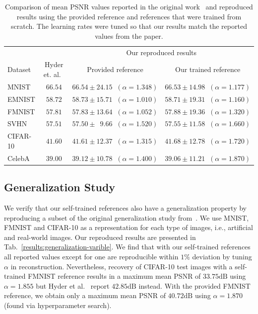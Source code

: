 \begin{table}
	\centering\small
	\begin{tabular}{lccc}
		\toprule
		&  & \multicolumn{2}{c}{Our reproduced results}\\
		Dataset & Hyder et. al.~\cite{hyder2020solving} &\multicolumn{1}{c}{Provided reference} & \multicolumn{1}{c}{Our trained reference}\\
		\midrule
		MNIST & $66.54$& $66.54 \pm 24.15\;\; (\alpha=1.348)$ & $66.53 \pm 14.98\;\; (\alpha=1.177)$ \\
		EMNIST & $58.72$ & $58.73 \pm 15.71\;\; (\alpha= 1.010)$ & $58.71 \pm 19.31\;\; (\alpha= 1.160)$\\
		FMNIST & $57.81$  & $57.83\pm 13.64\;\; (\alpha= 1.052)$ & $57.88 \pm 19.36\;\; (\alpha= 1.320)$\\
		SVHN & $57.51$ & $57.50 \pm \phantom{0}9.66\;\; (\alpha= 1.520)$ & $57.55 \pm 11.58\;\; (\alpha= 1.660)$\\
		CIFAR-10 &  $41.60$ & $41.61 \pm 12.37\;\; (\alpha= 1.315)$ & $41.68 \pm 12.78\;\; (\alpha= 1.720)$\\
		CelebA &  $39.00$ & $39.12 \pm 10.78\;\; (\alpha= 1.400)$ & $39.06 \pm 11.21\;\; (\alpha= 1.870)$\\
		\bottomrule
	\end{tabular}
	\caption{Comparison of mean PSNR values reported in the original work~\cite{hyder2020solving} and reproduced results using the provided reference and references that were trained from scratch. The learning rates were tuned so that our results match the reported values from the paper.}
	\label{results:reproduction}
\end{table}


\subsection{Generalization Study}

 We verify that our self-trained references also have a generalization property by reproducing a subset of the original generalization study from~\cite{hyder2020solving}. We use MNIST, FMNIST and CIFAR-10 as a representation for each type of images, i.e., artificial and real-world images. Our reproduced results are presented in Tab.~\ref{results:generalization-varible}.
We find that with our self-trained references all reported values
except for one are reproducible within $1\%$ deviation by tuning $\alpha$ in reconstruction. Nevertheless, recovery of CIFAR-10 test
images with a self-trained FMNIST reference results in a maximum mean
PSNR of $33.75\text{dB}$ using $\alpha = 1.855$ but Hyder et
al.~\cite{hyder2020solving} report $42.85\text{dB}$ instead. With the
provided FMNIST reference, we obtain only a maximum mean PSNR of
$40.72\text{dB}$ using $\alpha = 1.870$ (found via hyperparameter
search).

